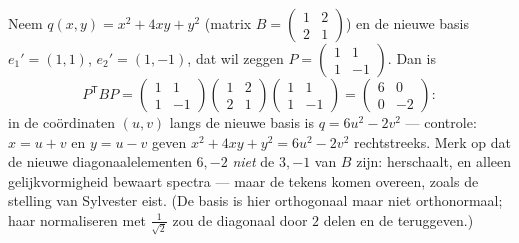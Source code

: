 \begin{example}\label{ex:b2:quadratic:congruence}
Neem $q(x, y) = x^2 + 4xy + y^2$ (matrix $B = \begin{pmatrix} 1 &
2\\ 2 & 1\end{pmatrix}$) en de nieuwe basis $e_1' = (1, 1)$, $e_2'
= (1, -1)$, dat wil zeggen $P = \begin{pmatrix} 1 & 1\\ 1 &
-1\end{pmatrix}$. Dan is
\[
P^{\mathsf T}BP
= \begin{pmatrix} 1 & 1\\ 1 & -1\end{pmatrix}
\begin{pmatrix} 1 & 2\\ 2 & 1\end{pmatrix}
\begin{pmatrix} 1 & 1\\ 1 & -1\end{pmatrix}
= \begin{pmatrix} 6 & 0\\ 0 & -2\end{pmatrix} :
\]
in de coördinaten $(u, v)$ langs de nieuwe basis is $q = 6u^2 -
2v^2$ --- controle: $x = u + v$ en $y = u - v$ geven $x^2 + 4xy +
y^2 = 6u^2 - 2v^2$ rechtstreeks. Merk op dat de nieuwe
diagonaalelementen $6, -2$ \emph{niet} de  $3, -1$ van
$B$ zijn:  herschaalt, en alleen gelijkvormigheid
bewaart spectra --- maar de tekens komen overeen, zoals de stelling
van Sylvester eist. (De basis is hier orthogonaal maar niet
orthonormaal; haar normaliseren met $\frac{1}{\sqrt2}$ zou de
diagonaal door $2$ delen en de  teruggeven.)
\end{example}

